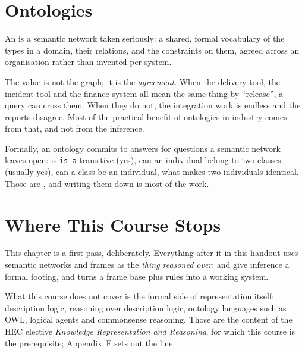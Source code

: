 \section{Ontologies}

An  is a semantic network taken seriously: a shared, formal
vocabulary of the types in a domain, their relations, and the constraints on them,
agreed across an organisation rather than invented per system.

The value is not the graph; it is the \emph{agreement}. When the delivery tool, the
incident tool and the finance system all mean the same thing by ``release'', a query
can cross them. When they do not, the integration work is endless and the reports
disagree. Most of the practical benefit of ontologies in industry comes from that,
and not from the inference.

Formally, an ontology commits to answers for questions a semantic network leaves
open: is \texttt{is-a} transitive (yes), can an individual belong to two classes
(usually yes), can a class be an individual, what makes two individuals identical.
Those are , and writing them down is most of the work.

\section{Where This Course Stops}

This chapter is a first pass, deliberately. Everything after it in this handout
uses semantic networks and frames as the \emph{thing reasoned over}:
 and  give inference a formal footing, and
 turns a frame base plus rules into a working system.

What this course does not cover is the formal side of representation itself:
description logic, reasoning over description logic, ontology languages such as OWL,
logical agents and commonsense reasoning. Those are the content of the HEC elective
\emph{Knowledge Representation and Reasoning}, for which this course is the
prerequisite; Appendix~F sets out the line.

